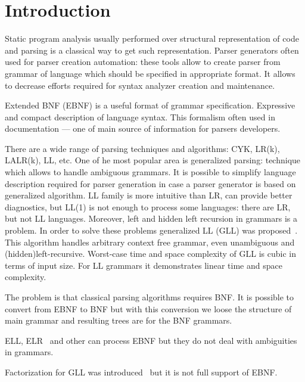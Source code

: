 \documentclass[runningheads,a4paper]{llncs}
\begin{document}
\section{Introduction}%

Static program analysis usually performed over structural representation of code and parsing is a classical way to get such representation.
Parser generators often used for parser creation automation: these tools allow to create parser from grammar of language which should be specified in appropriate format.
It allows to decrease efforts required for syntax analyzer creation and maintenance.

Extended BNF (EBNF) is a useful format of grammar specification. 
Expressive and compact description of language syntax. 
This formalism often used in documentation --- one of main source of information for parsers developers.

There are a wide range of parsing techniques and algorithms: CYK, LR(k), LALR(k), LL, etc. 
One of he most popular area is generalized parsing: technique which allows to handle ambiguous grammars. 
It is possible to simplify language description required for parser generation in case a parser generator is based on generalized algorithm.
LL family is more intuitive than LR, can provide better diagnostics, but LL(1) is not enough to process some languages: there are LR, but not LL languages.
Moreover, left and hidden left recursion in grammars is a problem. 
In order to solve these problems generalized LL (GLL) was proposed~\cite{scott2010gll}. 
This algorithm handles arbitrary context free grammar, even unambiguous and (hidden)left-recursive.
Worst-case time and space complexity of GLL is cubic in terms of input size. 
For LL grammars it demonstrates linear time and space complexity.

The problem is that classical parsing algorithms requires BNF.
It is possible to convert from EBNF to BNF but with this conversion we loose the structure of main grammar and resulting trees are for the BNF grammars.

ELL, ELR~\cite{AttributedELL,ELRR,ECFGparsing,ELLParser,ELL,ECFG,ELALR,ELRParsing} and other can process EBNF but they do not deal with ambiguities in grammars.

Factorization for GLL was introduced~\cite{scott2016structuring} but it is not full support of EBNF.
\end{document}
